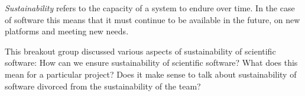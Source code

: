 \documentclass[a4paper,UKenglish]{dagrep}
\begin{document}



%

\emph{Sustainability} refers to the capacity of a system to endure over time. In the case of software this means that it must continue to be available in the future, on new platforms and meeting new needs.

This breakout group discussed various aspects of sustainability of scientific software:
How can we ensure sustainability of scientific software? What does this mean for a particular project? Does it make sense to talk about sustainability of software divorced from the sustainability of the team?
\end{document}
